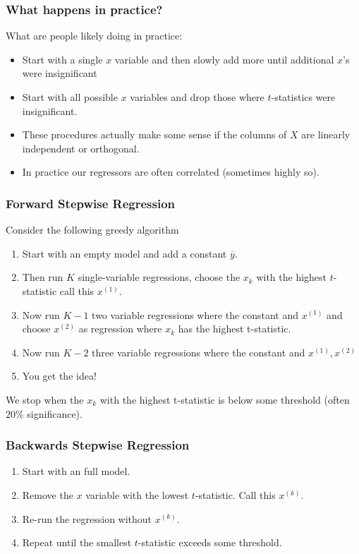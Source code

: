 \documentclass[xcolor=pdftex,dvipsnames,table,mathserif,aspectratio=169]{beamer}
\begin{document}
\begin{frame}
\frametitle{What happens in practice?}
What are people likely doing in practice:
\begin{itemize}
\item Start with a single $x$ variable and then slowly add more until additional $x$'s were insignificant
\item Start with all possible $x$ variables and drop those where $t$-statistics were insignificant.
\item These procedures actually make some sense if the columns of $X$ are \alert{linearly independent} or \alert{orthogonal}.
\item In practice our regressors are often correlated (sometimes highly so).
\end{itemize}
\end{frame}


\begin{frame}
\frametitle{Forward Stepwise Regression}
Consider the following \alert{greedy algorithm}
\begin{enumerate}
\item Start with an empty model and add a constant $\overline{y}$.
\item Then run $K$ single-variable regressions, choose the $x_k$ with the highest $t$-statistic call this $x^{(1)}$.
\item Now run $K-1$ two variable regressions where the constant and $x^{(1)}$ and choose $x^{(2)}$ as regression where $x_k$ has the highest t-statistic.
\item Now run $K-2$ three variable regressions where the constant and $x^{(1)},x^{(2)}$
\item You get the idea!
\end{enumerate}
We stop when the $x_k$ with the highest t-statistic is below some threshold (often 20\% significance).
\end{frame}


\begin{frame}
\frametitle{Backwards Stepwise Regression}
\begin{enumerate}
\item Start with an full model.
\item Remove the $x$ variable with the lowest $t$-statistic. Call this $x^{(k)}$.
\item Re-run the regression without $x^{(k)}$.
\item Repeat until the smallest $t$-statistic exceeds some threshold.
\end{enumerate}
\end{frame}
\end{document}
